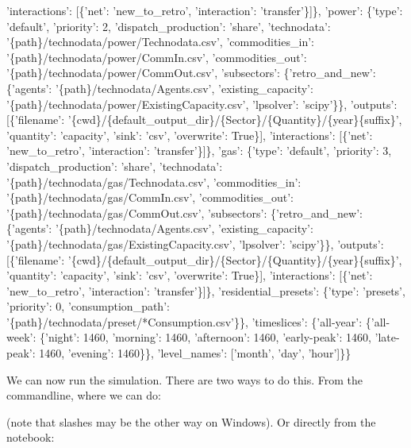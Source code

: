 \documentclass[letterpaper,10pt,english]{sphinxmanual}
\begin{document}
{\begin{sphinxVerbatim}[commandchars=\\\{\}]
   'interactions': [\{'net': 'new\_to\_retro', 'interaction': 'transfer'\}]\},
  'power': \{'type': 'default',
   'priority': 2,
   'dispatch\_production': 'share',
   'technodata': '\{path\}/technodata/power/Technodata.csv',
   'commodities\_in': '\{path\}/technodata/power/CommIn.csv',
   'commodities\_out': '\{path\}/technodata/power/CommOut.csv',
   'subsectors': \{'retro\_and\_new': \{'agents': '\{path\}/technodata/Agents.csv',
     'existing\_capacity': '\{path\}/technodata/power/ExistingCapacity.csv',
     'lpsolver': 'scipy'\}\},
   'outputs': [\{'filename': '\{cwd\}/\{default\_output\_dir\}/\{Sector\}/\{Quantity\}/\{year\}\{suffix\}',
     'quantity': 'capacity',
     'sink': 'csv',
     'overwrite': True\}],
   'interactions': [\{'net': 'new\_to\_retro', 'interaction': 'transfer'\}]\},
  'gas': \{'type': 'default',
   'priority': 3,
   'dispatch\_production': 'share',
   'technodata': '\{path\}/technodata/gas/Technodata.csv',
   'commodities\_in': '\{path\}/technodata/gas/CommIn.csv',
   'commodities\_out': '\{path\}/technodata/gas/CommOut.csv',
   'subsectors': \{'retro\_and\_new': \{'agents': '\{path\}/technodata/Agents.csv',
     'existing\_capacity': '\{path\}/technodata/gas/ExistingCapacity.csv',
     'lpsolver': 'scipy'\}\},
   'outputs': [\{'filename': '\{cwd\}/\{default\_output\_dir\}/\{Sector\}/\{Quantity\}/\{year\}\{suffix\}',
     'quantity': 'capacity',
     'sink': 'csv',
     'overwrite': True\}],
   'interactions': [\{'net': 'new\_to\_retro', 'interaction': 'transfer'\}]\},
  'residential\_presets': \{'type': 'presets',
   'priority': 0,
   'consumption\_path': '\{path\}/technodata/preset/*Consumption.csv'\}\},
 'timeslices': \{'all-year': \{'all-week': \{'night': 1460,
    'morning': 1460,
    'afternoon': 1460,
    'early-peak': 1460,
    'late-peak': 1460,
    'evening': 1460\}\},
  'level\_names': ['month', 'day', 'hour']\}\}
\end{sphinxVerbatim}
}

We can now run the simulation. There are two ways to do this. From the command\sphinxhyphen{}line, where we can do:

\begin{sphinxVerbatim}[commandchars=\\\{\}]
   
\end{sphinxVerbatim}

(note that slashes may be the other way on Windows). Or directly from the notebook:
\end{document}
